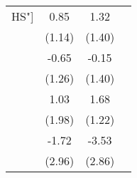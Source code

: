 \documentclass{article}
\begin{document}
\begin{tabular}{lccc}
HS"]&0.85&1.32&\\&(1.14)&(1.40)&\\["Father: Coll."]&-0.65&-0.15&\\&(1.26)&(1.40)&\\["Child Age"]&1.03&1.68&\\&(1.98)&(1.22)&\\["0-5"]&-1.72&-3.53&\\&(2.96)&(2.86)&\\\bottomrule\end{tabular}
\end{document}
